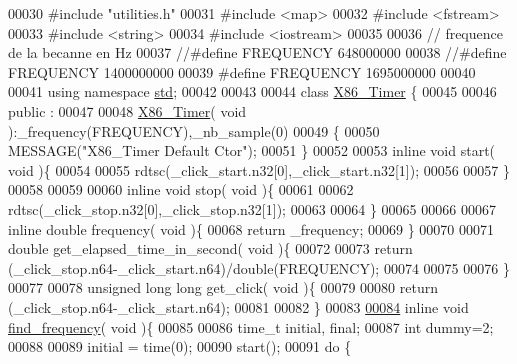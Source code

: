 \begin{DoxyCode}
00030 \textcolor{preprocessor}{#include "utilities.h"}
00031 \textcolor{preprocessor}{#include <map>}
00032 \textcolor{preprocessor}{#include <fstream>}
00033 \textcolor{preprocessor}{#include <string>}
00034 \textcolor{preprocessor}{#include <iostream>}
00035 
00036 \textcolor{comment}{// frequence de la becanne en Hz}
00037 \textcolor{comment}{//#define FREQUENCY 648000000}
00038 \textcolor{comment}{//#define FREQUENCY 1400000000}
00039 \textcolor{preprocessor}{#define FREQUENCY 1695000000}
00040 
00041 \textcolor{keyword}{using namespace }\hyperlink{namespacestd}{std};
00042 
00043 
00044 \textcolor{keyword}{class }\hyperlink{class_x86___timer}{X86\_Timer} \{
00045 
00046 public :
00047 
00048   \hyperlink{class_x86___timer}{X86\_Timer}( \textcolor{keywordtype}{void} ):\_frequency(FREQUENCY),\_nb\_sample(0)
00049   \{
00050     MESSAGE(\textcolor{stringliteral}{"X86\_Timer Default Ctor"});    
00051   \}
00052 
00053   \textcolor{keyword}{inline} \textcolor{keywordtype}{void} start( \textcolor{keywordtype}{void} )\{
00054 
00055     rdtsc(\_click\_start.n32[0],\_click\_start.n32[1]);
00056 
00057   \}
00058 
00059 
00060   \textcolor{keyword}{inline} \textcolor{keywordtype}{void} stop( \textcolor{keywordtype}{void} )\{
00061 
00062     rdtsc(\_click\_stop.n32[0],\_click\_stop.n32[1]);
00063 
00064   \}
00065   
00066 
00067   \textcolor{keyword}{inline} \textcolor{keywordtype}{double} frequency( \textcolor{keywordtype}{void} )\{
00068     \textcolor{keywordflow}{return} \_frequency;
00069   \}
00070 
00071   \textcolor{keywordtype}{double} get\_elapsed\_time\_in\_second( \textcolor{keywordtype}{void} )\{
00072 
00073     \textcolor{keywordflow}{return} (\_click\_stop.n64-\_click\_start.n64)/double(FREQUENCY);
00074 
00075 
00076   \}    
00077 
00078   \textcolor{keywordtype}{unsigned} \textcolor{keywordtype}{long} \textcolor{keywordtype}{long}  get\_click( \textcolor{keywordtype}{void} )\{
00079     
00080     \textcolor{keywordflow}{return} (\_click\_stop.n64-\_click\_start.n64);
00081 
00082   \}    
00083 
\hyperlink{class_x86___timer_a1beddd8cb10ed89d3dd06d3b233b63e1}{00084}   \textcolor{keyword}{inline} \textcolor{keywordtype}{void} \hyperlink{class_x86___timer_a1beddd8cb10ed89d3dd06d3b233b63e1}{find\_frequency}( \textcolor{keywordtype}{void} )\{
00085 
00086     time\_t initial, \textcolor{keyword}{final};
00087     \textcolor{keywordtype}{int} dummy=2;
00088 
00089     initial = time(0);
00090     start();
00091     \textcolor{keywordflow}{do} \{

\end{DoxyCode}
